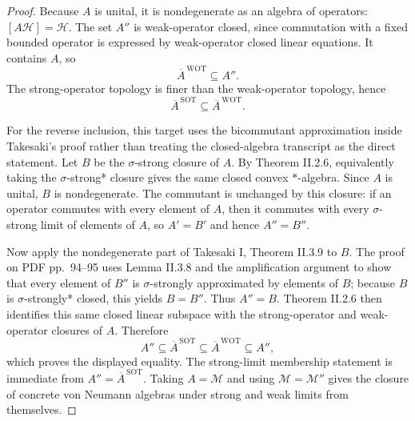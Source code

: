 \documentclass{article}
\newcommand{\cH}{\mathcal H}
\newcommand{\cM}{\mathcal M}
\begin{document}
\begin{proof}
Because \(A\) is unital, it is nondegenerate as an algebra of operators:
\([A\cH]=\cH\).  The set \(A''\) is weak-operator closed, since commutation
with a fixed bounded operator is expressed by weak-operator closed linear
equations.  It contains \(A\), so
\[
  \overline{A}^{\,\mathrm{WOT}}\subseteq A''.
\]
The strong-operator topology is finer than the weak-operator topology, hence
\[
  \overline{A}^{\,\mathrm{SOT}}\subseteq
  \overline{A}^{\,\mathrm{WOT}}.
\]

For the reverse inclusion, this target uses the bicommutant approximation
inside Takesaki's proof rather than treating the closed-algebra transcript as
the direct statement.  Let \(B\) be the \(\sigma\)-strong closure of \(A\).
By Theorem II.2.6, equivalently taking the \(\sigma\)-strong* closure gives
the same closed convex \(*\)-algebra.  Since \(A\) is unital, \(B\) is
nondegenerate.  The commutant is unchanged by this closure:
if an operator commutes with every element of \(A\), then it commutes with
every \(\sigma\)-strong limit of elements of \(A\), so \(A'=B'\) and hence
\(A''=B''\).

Now apply the nondegenerate part of Takesaki I, Theorem II.3.9 to \(B\).  The
proof on PDF pp.~94--95 uses Lemma II.3.8 and the amplification argument to
show that every element of \(B''\) is \(\sigma\)-strongly approximated by
elements of \(B\); because \(B\) is \(\sigma\)-strongly* closed, this yields
\(B=B''\).  Thus \(A''=B\).  Theorem II.2.6 then identifies this same closed
linear subspace with the strong-operator and weak-operator closures of \(A\).
Therefore
\[
  A''\subseteq\overline{A}^{\,\mathrm{SOT}}
  \subseteq\overline{A}^{\,\mathrm{WOT}}
  \subseteq A'',
\]
which proves the displayed equality.  The strong-limit membership statement
is immediate from \(A''=\overline{A}^{\,\mathrm{SOT}}\).  Taking
\(A=\cM\) and using \(\cM=\cM''\) gives the closure of concrete von Neumann
algebras under strong and weak limits from themselves.
\end{proof}
\end{document}
